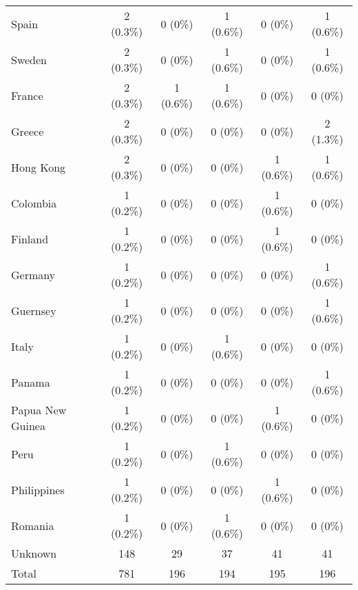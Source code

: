 \documentclass[12pt]{article}
\begin{document}
\begin{table}
{\begin{tabular}{lccccc}
    Spain & 2 (0.3\%) & 0 (0\%) & 1 (0.6\%) & 0 (0\%) & 1 (0.6\%)\\
    Sweden & 2 (0.3\%) & 0 (0\%) & 1 (0.6\%) & 0 (0\%) & 1 (0.6\%)\\
    France & 2 (0.3\%) & 1 (0.6\%) & 1 (0.6\%) & 0 (0\%) & 0 (0\%)\\
    Greece & 2 (0.3\%) & 0 (0\%) & 0 (0\%) & 0 (0\%) & 2 (1.3\%)\\
    Hong Kong & 2 (0.3\%) & 0 (0\%) & 0 (0\%) & 1 (0.6\%) & 1 (0.6\%)\\
    Colombia & 1 (0.2\%) & 0 (0\%) & 0 (0\%) & 1 (0.6\%) & 0 (0\%)\\
    Finland & 1 (0.2\%) & 0 (0\%) & 0 (0\%) & 1 (0.6\%) & 0 (0\%)\\
    Germany & 1 (0.2\%) & 0 (0\%) & 0 (0\%) & 0 (0\%) & 1 (0.6\%)\\
    Guernsey & 1 (0.2\%) & 0 (0\%) & 0 (0\%) & 0 (0\%) & 1 (0.6\%)\\
    Italy & 1 (0.2\%) & 0 (0\%) & 1 (0.6\%) & 0 (0\%) & 0 (0\%)\\
    Panama & 1 (0.2\%) & 0 (0\%) & 0 (0\%) & 0 (0\%) & 1 (0.6\%)\\
    Papua New Guinea & 1 (0.2\%) & 0 (0\%) & 0 (0\%) & 1 (0.6\%) & 0 (0\%)\\
    Peru & 1 (0.2\%) & 0 (0\%) & 1 (0.6\%) & 0 (0\%) & 0 (0\%)\\
    Philippines & 1 (0.2\%) & 0 (0\%) & 0 (0\%) & 1 (0.6\%) & 0 (0\%)\\
    Romania & 1 (0.2\%) & 0 (0\%) & 1 (0.6\%) & 0 (0\%) & 0 (0\%)\\
    Unknown & 148 & 29 & 37 & 41 & 41\\
    \midrule
    Total & 781 & 196 &  194 & 195 & 196\\
    \bottomrule
    \end{tabular}
    }

\end{table}

\end{document}
